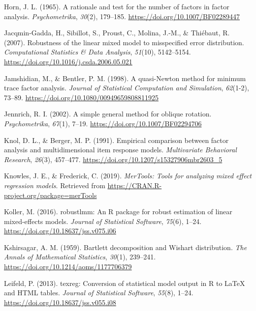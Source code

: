 \documentclass[
  english,
  man]{apa6}
\begin{document}
\leavevmode\hypertarget{ref-horn1965}{}%
Horn, J. L. (1965). A rationale and test for the number of factors in factor analysis. \emph{Psychometrika}, \emph{30}(2), 179--185. \url{https://doi.org/10.1007/BF02289447}

\leavevmode\hypertarget{ref-jacqmin2007}{}%
Jacqmin-Gadda, H., Sibillot, S., Proust, C., Molina, J.-M., \& Thiébaut, R. (2007). Robustness of the linear mixed model to misspecified error distribution. \emph{Computational Statistics \& Data Analysis}, \emph{51}(10), 5142--5154. \url{https://doi.org/10.1016/j.csda.2006.05.021}

\leavevmode\hypertarget{ref-jamshidian1998}{}%
Jamshidian, M., \& Bentler, P. M. (1998). A quasi-Newton method for minimum trace factor analysis. \emph{Journal of Statistical Computation and Simulation}, \emph{62}(1-2), 73--89. \url{https://doi.org/10.1080/00949659808811925}

\leavevmode\hypertarget{ref-jennrich2002}{}%
Jennrich, R. I. (2002). A simple general method for oblique rotation. \emph{Psychometrika}, \emph{67}(1), 7--19. \url{https://doi.org/10.1007/BF02294706}

\leavevmode\hypertarget{ref-knol1991}{}%
Knol, D. L., \& Berger, M. P. (1991). Empirical comparison between factor analysis and multidimensional item response models. \emph{Multivariate Behavioral Research}, \emph{26}(3), 457--477. \url{https://doi.org/10.1207/s15327906mbr2603_5}

\leavevmode\hypertarget{ref-R-merTools}{}%
Knowles, J. E., \& Frederick, C. (2019). \emph{MerTools: Tools for analyzing mixed effect regression models}. Retrieved from \url{https://CRAN.R-project.org/package=merTools}

\leavevmode\hypertarget{ref-robustlmm}{}%
Koller, M. (2016). robustlmm: An R package for robust estimation of linear mixed-effects models. \emph{Journal of Statistical Software}, \emph{75}(6), 1--24. \url{https://doi.org/10.18637/jss.v075.i06}

\leavevmode\hypertarget{ref-kshirsagar1959bartlett}{}%
Kshirsagar, A. M. (1959). Bartlett decomposition and Wishart distribution. \emph{The Annals of Mathematical Statistics}, \emph{30}(1), 239--241. \url{https://doi.org/10.1214/aoms/1177706379}

\leavevmode\hypertarget{ref-R-texreg}{}%
Leifeld, P. (2013). texreg: Conversion of statistical model output in R to LaTeX and HTML tables. \emph{Journal of Statistical Software}, \emph{55}(8), 1--24. \url{https://doi.org/10.18637/jss.v055.i08}
\end{document}
